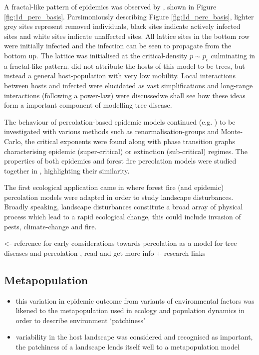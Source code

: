 A fractal-like pattern of epidemics was observed by \cite{GRASSBERGER1986273}, shown in Figure \ref{fig:1d_perc_basis}. Parsimoniously describing Figure \ref{fig:1d_perc_basis}, lighter grey sites represent removed individuals, black sites indicate actively infected sites and white sites indicate unaffected sites. All lattice sites in the bottom row were initially infected and the infection can be seen to propagate from the bottom up. The lattice was initialised at the critical-density $p\sim p_c$ culminating in a fractal-like pattern. \cite{GRASSBERGER1986273} did not attribute the hosts of this model to be trees, but instead a general host-population with very low mobility. Local interactions between hosts and infected were elucidated as vast simplifications and long-range interactions (following a power-law) were discussed\textemdash we shall see how these ideas form a important component of modelling tree disease.

The behaviour of percolation-based epidemic models continued (e.g. \cite{pub.1060474189, pub.1059069981}) to be investigated with various methods such as renormalisation-groups and Monte-Carlo, the critical exponents were found along with phase transition graphs characterising epidemic (super-critical) or extinction (sub-critical) regimes. The properties of both epidemics and forest fire percolation models were studied together in \cite{pub.1052857560}, highlighting their similarity.

The first ecological application came in \cite{pub.1031591030} where forest fire (and epidemic) percolation models were adapted in order to study landscape disturbances. Broadly speaking, landscape disturbances constitute a broad array of physical process which lead to a rapid ecological change, this could include invasion of pests, climate-change and fire.

\textemdash\cite{GRASSBERGER1983157} <- reference for early considerations towards percolation as a model for tree diseases and percolation
\textemdash\cite{SANDER2002293}, read and get more info + research links

\subsection{Metapopulation}

\begin{itemize}
    \item this variation in epidemic outcome from variants of environmental factors was likened to the metapopulation used in ecology and population dynamics in order to describe environment `patchiness'
    \item variability in the host landscape was considered and recognised as important, the patchiness of a landscape lends itself well to a metapopulation model
    \cite{doi:10.1098/rstb.1986.0072}

\end{itemize}
